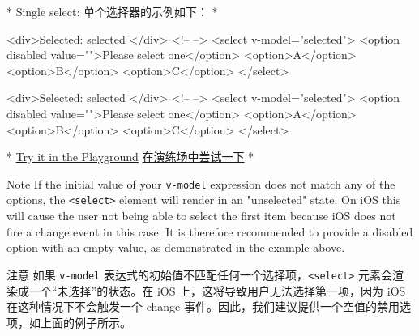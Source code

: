 \begin{paracol}{2}
\switchcolumn[0]*%
Single select:
\switchcolumn
单个选择器的示例如下：
\switchcolumn[0]*%
\begin{codeHtml}
<div>Selected: {{ selected }}</div>
<!-- -->
<select v-model="selected">
  <option disabled value="">Please select one</option>
  <option>A</option>
  <option>B</option>
  <option>C</option>
</select>
\end{codeHtml}
\switchcolumn
\begin{codeHtml}
<div>Selected: {{ selected }}</div>
<!-- -->
<select v-model="selected">
  <option disabled value="">Please select one</option>
  <option>A</option>
  <option>B</option>
  <option>C</option>
</select>
\end{codeHtml}
\switchcolumn[0]*%
\href{https://play.vuejs.org/\#eNp1j7EOgyAQhl/lwmI7tO4Nmti+QJOuLFTPxASBALoQ3r2H2jYOjvff939wkTXWXucJ2Y1x37rBBvAYJlsLPYzWuAARHPaQoHdmhILQQmihW6N9RhW2ATuoMnQqirPQvFw9ZKAh4GiVDEgTAPdW6hpeW+sGMf4VKVEz73Mvs8sC5stoOlSVYF9SsEVGiLFhMBq6wcu3IsUs1YREEvFUKD1udjAaebnS+27dHOT3g/yxy+nHywM08PJ3KksfXwJ2dA==}{Try
it in the Playground}
\switchcolumn
\href{https://play.vuejs.org/\#eNp1j7EOgyAQhl/lwmI7tO4Nmti+QJOuLFTPxASBALoQ3r2H2jYOjvff939wkTXWXucJ2Y1x37rBBvAYJlsLPYzWuAARHPaQoHdmhILQQmihW6N9RhW2ATuoMnQqirPQvFw9ZKAh4GiVDEgTAPdW6hpeW+sGMf4VKVEz73Mvs8sC5stoOlSVYF9SsEVGiLFhMBq6wcu3IsUs1YREEvFUKD1udjAaebnS+27dHOT3g/yxy+nHywM08PJ3KksfXwJ2dA==}{在演练场中尝试一下}
\switchcolumn[0]*%
\begin{vueQuote}{Note}
If the initial value of your \texttt{v-model} expression does not match
any of the options, the \texttt{\textless{}select\textgreater{}} element
will render in an "unselected" state. On iOS this will cause the user
not being able to select the first item because iOS does not fire a
change event in this case. It is therefore recommended to provide a
disabled option with an empty value, as demonstrated in the example
above.
\end{vueQuote} 
\switchcolumn
\begin{vueQuote}{注意}
如果 \texttt{v-model}
表达式的初始值不匹配任何一个选择项，\texttt{\textless{}select\textgreater{}}
元素会渲染成一个``未选择''的状态。在 iOS
上，这将导致用户无法选择第一项，因为 iOS 在这种情况下不会触发一个 change
事件。因此，我们建议提供一个空值的禁用选项，如上面的例子所示。
\end{vueQuote} 



\end{paracol}
